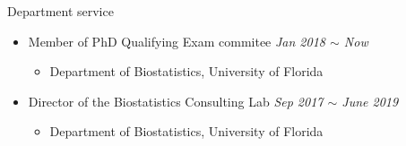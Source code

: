 \documentclass{resume} %
\begin{document}
\begin{rSection}{Department service}
\begin{itemize}[noitemsep,topsep=0pt]

\item Member of PhD Qualifying Exam commitee 
        \hfill {\em Jan 2018 $\sim$ Now} 
        \begin{itemize}
        \item Department of Biostatistics, University of Florida
        \end{itemize}

\item Director of the Biostatistics Consulting Lab
        \hfill {\em Sep 2017 $\sim$ June 2019} 
        \begin{itemize}
        \item Department of Biostatistics, University of Florida
        \end{itemize}


\end{itemize}
\end{rSection}
\end{document}
